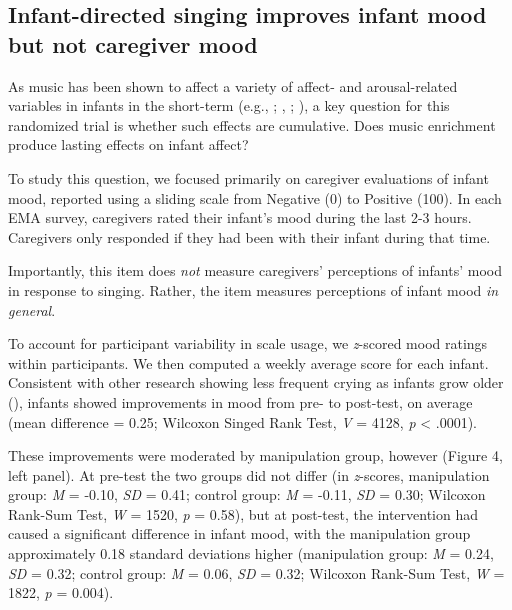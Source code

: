 \documentclass[
]{article}
\begin{document}
\subsection{Infant-directed singing improves infant mood but not
caregiver
mood}\label{infant-directed-singing-improves-infant-mood-but-not-caregiver-mood}

As music has been shown to affect a variety of affect- and
arousal-related variables in infants in the short-term (e.g.,
;
,
; ), a key question for this randomized trial is whether such
effects are cumulative. Does music enrichment produce lasting effects on
infant affect?

To study this question, we focused primarily on caregiver evaluations of
infant mood, reported using a sliding scale from Negative (0) to
Positive (100). In each EMA survey, caregivers rated their infant's mood
during the last 2-3 hours. Caregivers only responded if they had been
with their infant during that time.

Importantly, this item does \emph{not} measure caregivers' perceptions
of infants' mood in response to singing. Rather, the item measures
perceptions of infant mood \emph{in general}.

To account for participant variability in scale usage, we
\emph{z}-scored mood ratings within participants. We then computed a
weekly average score for each infant. Consistent with other research
showing less frequent crying as infants grow older
(), infants showed improvements in
mood from pre- to post-test, on average (mean difference = 0.25;
Wilcoxon Singed Rank Test, \emph{V} = 4128, \emph{p} \textless{} .0001).

These improvements were moderated by manipulation group, however (Figure
4, left panel). At pre-test the two groups did not differ (in
\emph{z}-scores, manipulation group: \emph{M} = -0.10, \emph{SD} = 0.41;
control group: \emph{M} = -0.11, \emph{SD} = 0.30; Wilcoxon Rank-Sum
Test, \emph{W} = 1520, \emph{p} = 0.58), but at post-test, the
intervention had caused a significant difference in infant mood, with
the manipulation group approximately 0.18 standard deviations higher
(manipulation group: \emph{M} = 0.24, \emph{SD} = 0.32; control group:
\emph{M} = 0.06, \emph{SD} = 0.32; Wilcoxon Rank-Sum Test, \emph{W} =
1822, \emph{p} = 0.004).
\end{document}
